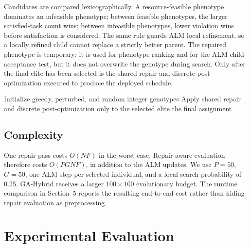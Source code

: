 \documentclass[pdflatex,sn-mathphys-num]{sn-jnl}
\begin{document}
Candidates are compared lexicographically. A resource-feasible phenotype dominates an infeasible phenotype; between feasible phenotypes, the larger satisfied-task count wins; between infeasible phenotypes, lower violation wins before satisfaction is considered. The same rule guards ALM local refinement, so a locally refined child cannot replace a strictly better parent. The repaired phenotype is temporary: it is used for phenotype ranking and for the ALM child-acceptance test, but it does not overwrite the genotype during search. Only after the final elite has been selected is the shared repair and discrete post-optimization executed to produce the deployed schedule.

\begin{algorithm}[t]
\caption{Outcome-Aligned M-CA-ALM}
\label{alg:mca_official}
\SetAlgoLined
{}
Initialize greedy, perturbed, and random integer genotypes\;
Apply shared repair and discrete post-optimization only to the selected elite\;
\Return the final assignment\;
\end{algorithm}

\subsection{Complexity}
One repair pass costs $O(NF)$ in the worst case. Repair-aware evaluation therefore costs $O(PGNF)$, in addition to the ALM updates. We use $P=50$, $G=50$, one ALM step per selected individual, and a local-search probability of 0.25. GA-Hybrid receives a larger $100\times100$ evolutionary budget. The runtime comparison in Section~5 reports the resulting end-to-end cost rather than hiding repair evaluation as preprocessing.



\section{Experimental Evaluation}
\end{document}
